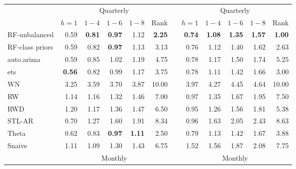 \documentclass[11pt,a4paper,]{article}
\begin{document}
\begin{table}[!htbp]
\begin{tabular}{lrrrrrrrrrrr}
           &                                 \multicolumn{ 5}{c}{Quarterly} &            &                                 \multicolumn{ 5}{c}{Quarterly} \\
                     &    $h=1$   &    $1-4$   &     $1-6$  &     $1-8$  &      Rank  &            &     $h=1$  &    $1-4$   &     $1-6$  &     $1-8$  &   Rank \\\cmidrule(lr){2-6} \cmidrule(lr){8-12}
RF-unbalanced        &       0.59 & {\bf 0.81} & {\bf 0.97} &       1.12 & {\bf 2.25} &            & {\bf 0.74} & {\bf 1.08} & {\bf 1.35} & {\bf 1.57} & {\bf 1.00} \\
RF-class priors      &       0.59 & 0.82 &       {\bf 0.97} &       1.13 &  3.13 &            &       0.76 &       1.12 &       1.40 &       1.62 &       2.63 \\
auto.arima           &       0.59 &       0.85 &       1.02 &       1.19 &       4.75 &            &       0.78 &       1.17 &       1.50 &       1.74 &       5.25 \\
ets                  & {\bf 0.56} &       0.82 &       0.99 &       1.17 &       3.75 &            &       0.78 &       1.11 &       1.42 &       1.66 &       3.00 \\
WN                   &       3.25 &       3.59 &       3.70 &       3.87 &      10.00 &            &       3.97 &       4.27 &       4.45 &       4.64 &      10.00 \\
RW                   &       1.14 &       1.16 &       1.32 &       1.46 &       7.00 &            &       0.97 &       1.35 &       1.67 &       1.95 &       7.50 \\
RWD                  &       1.20 &       1.17 &       1.36 &       1.47 &       6.50 &            &       0.95 &       1.26 &       1.56 &       1.81 &       5.38 \\
STL-AR               &       0.70 &       1.27 &       1.60 &       1.91 &       8.34 &            &       0.96 &       1.63 &       2.05 &       2.43 &       8.63 \\
Theta                &       0.62 &       0.83 &       {\bf 0.97} & {\bf 1.11} &  2.50 &            &       0.79 &       1.13 &       1.42 &       1.67 &       3.88 \\
Snaive               &       1.11 &       1.09 &       1.30 &       1.43 &       6.75 &            &       1.52 &       1.56 &       1.87 &       2.08 &       7.75 \\\cmidrule(lr){2-6} \cmidrule(lr){8-12}
           &                                   \multicolumn{ 5}{c}{Monthly} &            &                                   \multicolumn{ 5}{c}{Monthly} \\

\end{tabular}
\end{table}
\end{document}
